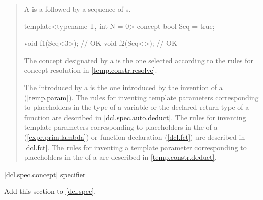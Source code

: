 \begin{quote}
\begin{addedblock}
\pnum
A  is a  followed 
by a sequence of s.
%
\enterexample
\begin{codeblock}
template<typename T, int N = 0> concept bool Seq = true;

void f1(Seq<3>); // OK
void f2(Seq<>);  // OK
\end{codeblock}
\exitexample

\pnum
The concept designated by a 
is the one selected according to the rules for concept resolution in
\ref{temp.constr.resolve}.

\pnum
\enternote
The  introduced by a 
 is the one introduced by the invention of a
 (\ref{temp.param}).
%
The rules for inventing template parameters corresponding to placeholders
in the type of a variable or the declared return type of a function are
described in \ref{dcl.spec.auto.deduct}.
% 
The rules for inventing template parameters corresponding to placeholders
in the  of a
 (\ref{expr.prim.lambda})
or function declaration (\ref{dcl.fct}) are described in
\ref{dcl.fct}.
% 
The rules for inventing a template parameter corresponding to placeholders
in the  of a 
 are described in 
\ref{temp.constr.deduct}.
\exitnote

\end{addedblock}
\end{quote}


[dcl.spec.concept]{ specifier}

Add this section to \ref{dcl.spec}.

